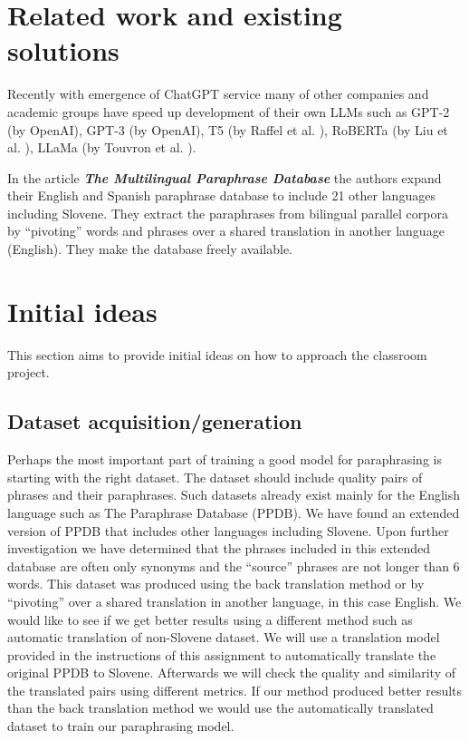 \documentclass[fleqn,moreauthors,10pt]{ds_report}
\begin{document}

\section*{Related work and existing solutions}
Recently with emergence of ChatGPT service many of other companies and academic groups have speed up development of their own LLMs such as GPT-2 (by OpenAI), GPT-3 (by OpenAI), T5 (by Raffel et al. \cite{https://doi.org/10.48550/arxiv.1910.10683}), RoBERTa (by Liu et al. \cite{https://doi.org/10.48550/arxiv.1907.11692}), LLaMa (by Touvron et al. \cite{https://doi.org/10.48550/arxiv.2302.13971}).

In the article \textit{\textbf{The Multilingual Paraphrase Database}}\cite{ganitkevitch2014multilingual} the authors expand their English and Spanish paraphrase database to include 21 other languages including Slovene. They extract the paraphrases from bilingual parallel corpora by “pivoting” words and phrases over a shared translation in another language (English). They make the database freely available. 




\section*{Initial ideas}
This section aims to provide initial ideas on how to approach the classroom project.

\subsection{Dataset acquisition/generation}
Perhaps the most important part of training a good model for paraphrasing is starting with the right dataset. The dataset should include quality pairs of phrases and their paraphrases. Such datasets already exist mainly for the English language such as The Paraphrase Database (PPDB)\cite{ganitkevitch2013ppdb}. We have found an extended version of PPDB that includes other languages including Slovene\cite{ganitkevitch2014multilingual}. Upon further investigation we have determined that the phrases included in this extended database are often only synonyms and the “source” phrases are not longer than 6 words. This dataset was produced using the back translation method or by “pivoting” over a shared translation in another language, in this case English. We would like to see if we get better results using a different method such as automatic translation of non-Slovene dataset. We will use a translation model provided in the instructions of this assignment \cite{Slovene_nmt} to automatically translate the original PPDB to Slovene. Afterwards we will check the quality and similarity of the translated pairs using different metrics. If our method produced better results than the back translation method we would use the automatically translated dataset to train our paraphrasing model.
\end{document}
